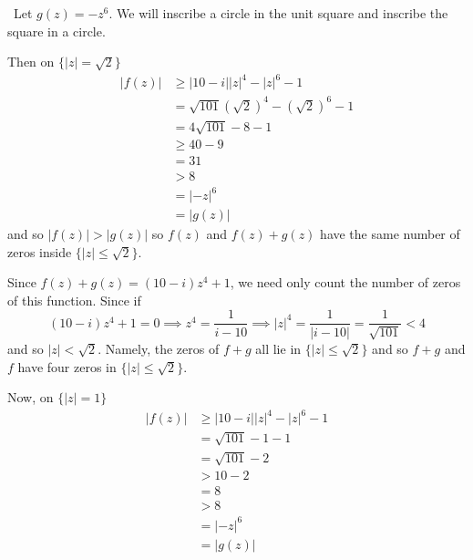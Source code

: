 \documentclass[12pt]{Homework}
\begin{document}
\begin{solution}$\,$
Let $g(z)=-z^6$. We will inscribe a circle in the unit square and inscribe the square in a circle.

\begin{center}
\end{center}

Then on $\{|z|=\sqrt{2}\}$ \begin{align*}
    |f(z)|&\ge |10-i||z|^4-|z|^6-1\\
    &=\sqrt{101}(\sqrt{2})^4-(\sqrt{2})^6-1\\
    &=4\sqrt{101}-8-1\\
    &\ge 40-9\\
    &=31\\
    &>8\\
    &=|-z|^6\\
    &=|g(z)|
\end{align*} and so $|f(z)|>|g(z)|$ so $f(z)$ and $f(z)+g(z)$ have the same number of zeros inside $\{|z|\le\sqrt{2}\}.$

Since $f(z)+g(z)=(10-i)z^4+1$, we need only count the number of zeros of this function. Since if $$(10-i)z^4+1=0\implies z^4=\frac{1}{i-10}\implies |z|^4=\frac{1}{|i-10|}=\frac{1}{\sqrt{101}}<4$$ and so $|z|<\sqrt{2}$. Namely, the zeros of $f+g$ all lie in $\{|z|\le\sqrt{2}\}$ and so $f+g$ and $f$ have four zeros in $\{|z|\le\sqrt{2}\}$.

Now, on $\{|z|=1\}$  \begin{align*}
    |f(z)|&\ge |10-i||z|^4-|z|^6-1\\
    &=\sqrt{101}-1-1\\
    &=\sqrt{101}-2\\
    &> 10-2\\
    &=8\\
    &>8\\
    &=|-z|^6\\
    &=|g(z)|
\end{align*}


\end{solution}
\end{document}
